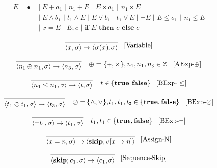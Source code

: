 \begin{align*}
E = \bullet &\text{ | } E + a_1 \text{ | } n_1 + E \text{ | } E \times a_1 \text{ | } n_1 \times E \\
  &\text{ | } E \land b_1 \text{ | } t_1 \land E  \text{ | } E \lor b_1 \text{ | } t_1 \lor E \text{ | } \neg E \text{ | } E \leq a_1 \text{ | } n_1 \leq E  \\
  &\text{ | } x = E \text{ | } E;c \text{ | } \textbf{if } E \textbf{ then } c \textbf{ else } c
\end{align*}

\[
\begin{prooftree}
\infer0{
	\langle x, \sigma \rangle 
	\rightarrow  
	\langle \sigma(x), \sigma \rangle 
}
\end{prooftree} \; \; \; [\text{Variable}]
\]

\[
\begin{prooftree}
\infer0{
	\langle n_1 \oplus n_1, \sigma \rangle \rightarrow  
	\langle n_3,  \sigma \rangle
}
\end{prooftree} \; \; \; \; \oplus = \{+,\times\}, n_1, n_1, n_3 \in \mathbb{Z} \; \; \; [\text{AExp-}\oplus]
\]

\[
\begin{prooftree}
\infer0{
	\langle n_1 \leq n_1, \sigma \rangle \rightarrow  
	\langle t, \sigma \rangle
}
\end{prooftree} \; \; \; \; t \in \{ \textbf{true}, \textbf{false} \} \; \; \; [\text{BExp-}\leq]
\]

\[
\begin{prooftree}
\infer0{
	\langle t_1 \oslash t_1, \sigma \rangle \rightarrow  
	\langle t_3,  \sigma \rangle
}
\end{prooftree} \; \; \; \; \oslash = \{\land,\lor\}, t_1, t_1, t_3 \in \{ \textbf{true}, \textbf{false} \}  \; \; \; [\text{BExp-}\oslash]
\]

\[
\begin{prooftree}
\infer0{
	\langle \neg t_1, \sigma \rangle \rightarrow  
	\langle t_1,  \sigma \rangle
}
\end{prooftree} \; \; \; \; t_1, t_1 \in \{ \textbf{true}, \textbf{false} \}  \; \; \; [\text{BExp-}\neg]
\]

\[
\begin{prooftree}
\infer0{
	\langle x = n, \sigma \rangle \rightarrow  
	\langle \textbf{skip},  \sigma[x \mapsto n] \rangle
}
\end{prooftree} \; \; \; [\text{Assign-N}]
\]

\[
\begin{prooftree}
\infer0{
	\langle \textbf{skip}; c_1,  \sigma \rangle \rightarrow  
	\langle c_1, \sigma \rangle
}
\end{prooftree} \; \; \; [\text{Sequence-Skip}]
\]

